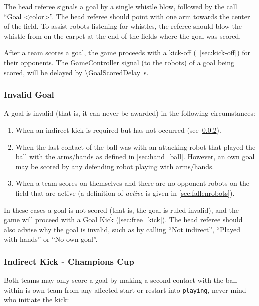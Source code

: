 The head referee signals a goal by a single whistle blow, followed by the call ``Goal \textless color\textgreater''.
The head referee should point with one arm towards the center of the field.
To assist robots listening for whistles, the referee should blow the whistle from on the carpet at the end of the fields where the goal was scored.

After a team scores a goal, the game proceeds with a kick-off (\cf~\cref{sec:kick-off}) for their opponents.
The GameController signal (to the robots) of a goal being scored, will be delayed by \qty{\GoalScoredDelay}{\second}.

\subsubsection{Invalid Goal}
\label{sec:invalid_goal}

A goal is invalid (that is, it can never be awarded) in the following circumstances:
\begin{enumerate}
    \item When an indirect kick is required but has not occurred (see~\cref{sec:indirect_kick_champions}).
    \item When the last contact of the ball was with an attacking robot that played the ball with the arms/hands as defined in \cref{sec:hand_ball}.
      However, an own goal may be scored by any defending robot playing with arms/hands.
    \item When a team scores on themselves and there are no opponent robots on the field that are active (a definition of \emph{active} is given in \cref{sec:fallenrobots}).
\end{enumerate}

In these cases a goal is not scored (that is, the goal is ruled invalid), and the game will proceed with a Goal Kick (\cf \cref{sec:free_kick}).
The head referee should also advise why the goal is invalid, such as by calling ``Not indirect'', ``Played with hands'' or ``No own goal''.

\subsubsection{Indirect Kick - Champions Cup}
\label{sec:indirect_kick_champions}

Both teams may only score a goal by making a second contact with the ball within is own team from any affected start or restart into \texttt{playing}, never mind who initiate the kick: 

